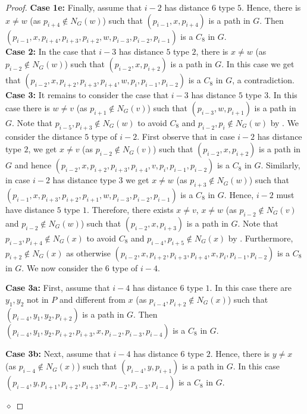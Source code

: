 \documentclass[runningheads,envcountsame]{llncs}
\newenvironment{claimproof}
{\noindent {\em Proof of Claim:} }
{\hfill $\diamond$ \smallskip}
\begin{document}
\begin{proof}
\begin{claimproof}
        \noindent\textbf{Case 1e:} Finally, assume that $i-2$ has distance $6$ type $5$. Hence, there  is $x\not=w$ (as $p_{i+4}\notin N_G(w)$) such that $(p_{i-1},x,p_{i+4})$ is a path in $G$. Then $(p_{i-1},x,p_{i+4},p_{i+3},p_{i+2},w,p_{i-3},p_{i-2},p_{i-1})$ is a $C_8$ in $G$.
        \\

        \noindent\textbf{Case 2:} In the case that $i-3$ has distance $5$ type $2$, there is $x\not=w$ (as $p_{i-2}\notin N_G(w)$) such that $(p_{i-2},x,p_{i+2})$ is a path in $G$. In this case we get that $(p_{i-2},x,p_{i+2},p_{i+3},p_{i+4},w,p_i, p_{i-1},p_{i-2})$ is a $C_8$ in $G$, a contradiction.\\

        \noindent\textbf{Case 3:} It remains to  consider the case that $i-3$ has distance $5$ type $3$. In this case there is $w\not=v$ (as $p_{i+1}\notin N_G(v)$) such that $(p_{i-3},w,p_{i+1})$ is a path in $G$. Note that $p_{i-5},p_{i+3}\notin N_G(w)$ to avoid $C_8$ and $p_{i-2},p_i\notin N_G(w)$ by . We consider the distance $5$ type of $i-2$. First observe that in case $i-2$ has distance type $2$, we get $x\not=v$ (as $p_{i-2}\notin N_G(v)$) such that $(p_{i-2},x,p_{i+2})$ is a path in $G$ and hence $(p_{i-2},x,p_{i+2}, p_{i+3},p_{i+4},v,p_i,p_{i-1},p_{i-2})$ is a $C_8$ in $G$. Similarly, in case $i-2$ has distance type $3$ we get $x\not=w$ (as $p_{i+3}\notin N_G(w)$) such that $(p_{i-1},x,p_{i+3}, p_{i+2},p_{i+1},w,p_{i-3},p_{i-2},p_{i-1})$ is a $C_8$ in $G$. Hence, $i-2$ must have distance $5$ type $1$. Therefore, there exists $x\not=v$, $x\not=w$ (as $p_{i-2}\notin N_G(v)$ and $p_{i-2}\notin N_G(w)$) such that $(p_{i-2},x,p_{i+3})$ is a path in $G$. Note that $p_{i-3},p_{i+4}\notin N_G(x)$ to avoid $C_8$ and $p_{i-4},p_{i+5}\notin N_G(x)$ by . Furthermore, $p_{i+2}\notin N_G(x)$ as otherwise $(p_{i-2},x,p_{i+2},p_{i+3},p_{i+4},x,p_i,p_{i-1},p_{i-2})$ is a $C_8$ in $G$.
        We now consider the 6 type of $i-4$.  

        \noindent\textbf{Case 3a:} First, assume that $i-4$ has distance $6$ type $1$. In this case there are $y_1,y_2$ not in $P$ and different from $x$ (as $p_{i-4},p_{i+2}\notin N_G(x)$) such that $(p_{i-4},y_1,y_2,p_{i+2})$ is a path in $G$. Then $(p_{i-4},y_1,y_2,p_{i+2},p_{i+3},x,p_{i-2},p_{i-3},p_{i-4})$ is a $C_8$ in $G$.

        \noindent\textbf{Case 3b:} Next, assume that $i-4$ has distance $6$ type $2$. Hence, there is $y\not=x$ (as $p_{i-4}\notin N_G(x)$) such that $(p_{i-4},y,p_{i+1})$ is a path in $G$. In this case  $(p_{i-4},y,p_{i+1},p_{i+2},p_{i+3},x,p_{i-2},p_{i-3},p_{i-4})$ is a $C_8$ in $G$.


\end{claimproof}
\end{proof}
\end{document}

